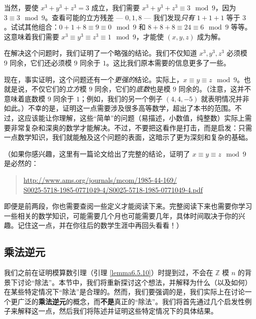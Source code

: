 \begin{example}
    当然，要使 $x^3 + y^3 + z^3 = 3$ 成立，我们需要 $x^3 + y^3 + z^3 \equiv 3 \mod 9$，因为 $3 \equiv 3 \mod 9$。查看可能的立方残差 --- $0, 1, 8$ --- 我们发现\emph{只有} $1 + 1 + 1$ 等于 $3$。试试其他组合：$0 + 1 + 8 \equiv 9 \equiv 0 \mod 9$ 和 $8 + 8 + 8 \equiv 24 \equiv 6 \mod 9$ 等等。这意味着我们需要 $x^3 \equiv y^3 \equiv z^3 \equiv 1 \mod 9$，才能使 $(x, y, z)$ 成为解。

    在解决这个问题时，我们证明了一个略强的结论。我们不仅知道 $x^3,y^3,z^3$ 必须模 $9$ 同余，它们还必须模 $9$ 同余于 $1$。这比我们原本需要的信息更多了一些。

    现在，事实证明，这个问题还有一个\emph{更强的}结论。实际上，$x \equiv y \equiv z \mod 9$。也就是说，不仅它们的\emph{立方}模 $9$ 同余，它们的\emph{底数}也是模 $9$ 同余的。（注意，这并不意味着底数模 $9$ 同余于 $1$；例如，我们的另一个例子 $(4, 4, -5)$ 就表明情况并非如此。）不幸的是，证明这一点需要涉及很多高等数学，超出了本书的范围。不过，这应该能让你理解，这些``简单''的问题（易描述，小数值，纯整数）实际上需要非常复杂和深奥的数学才能解决。不过，不要把这看作是打击，而是启发：只需一点数学知识，我们就能触及这个问题的表面，这暗示了更为深刻和复杂的基础。

    （如果你感兴趣，这里有一篇论文给出了完整的结论，证明了 $x \equiv y \equiv z \mod 9$ 是必然的：
    \begin{quote}
        \href{http://www.ams.org/journals/mcom/1985-44-169/S0025-5718-1985-0771049-4/S0025-5718-1985-0771049-4.pdf}{http://www.ams.org/journals/mcom/1985-44-169/\\S0025-5718-1985-0771049-4/S0025-5718-1985-0771049-4.pdf}
    \end{quote}
    即便是前两段，你也需要查阅一些定义才能阅读下来。完整阅读下来也需要你学习一些相关的数学知识，可能需要几个月也可能需要几年，具体时间取决于你的兴趣。记住这一点，并在你往后的数学生涯中再回头看看！）
\end{example}

\subsection{乘法逆元}\label{sec:section6.5.3}

我们之前在证明模算数引理（引理 \ref{lemma6.5.10}）时提到过，不会在 $\mathbb{Z}$ 模 $n$ 的背景下讨论``除法''。本节中，我们将重新探讨这个想法，并解释为什么（以及如何）在某些特定情况下``除法''是合理的。然而，我们要强调的是，我们实际上在讨论一个更广泛的\textbf{乘法逆元}的概念，而\textbf{不是}真正的``除法''。我们将首先通过几个启发性例子来解释这一点，然后我们将陈述并证明这些特定情况下的具体结果。


